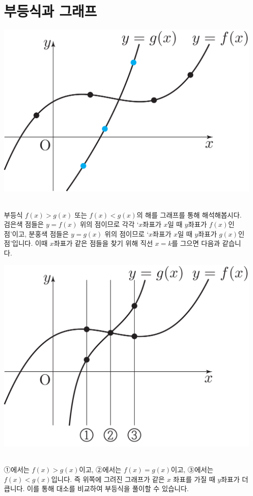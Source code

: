 \section{부등식과 그래프}
\begin{center} \includegraphics[scale=\pgfkeysvalueof{picsize}]{DBs/pic/zery_20.pdf}\
	\end{center}부등식 $f\left( x \right) > g\left( x \right)  $ 또는 $f\left( x \right) < g\left( x \right)  $의 해를 그래프를 통해 해석해봅시다. 검은색 점들은 $y=f\left( x \right) $ 위의 점이므로 각각 `$x$좌표가 $x$일 때 $y$좌표가 $f\left( x \right) $인 점'이고, 분홍색 점들은 $y=g\left( x \right) $ 위의 점이므로 `$x$좌표가 $x$일 때 $y$좌표가 $g\left( x \right) $인 점'입니다. 이때 $x$좌표가 같은 점들을 찾기 위해 직선 $x=k$를 그으면 다음과 같습니다.
	\clearpage
\vskip-10pt
\begin{center} \includegraphics[scale=\pgfkeysvalueof{picsize}]{DBs/pic/zery_21.pdf}\
	\end{center}①에서는 $f\left( x \right) > g\left( x \right) $이고, ②에서는 $f\left( x \right) = g\left( x \right) $이고, ③에서는 $f\left( x \right) < g\left( x \right) $입니다. 즉 위쪽에 그려진 그래프가 같은 $x$ 좌표를 가질 때 $y$좌표가 더 큽니다. 이를 통해 대소를 비교하여 부등식을 풀이할 수 있습니다.
